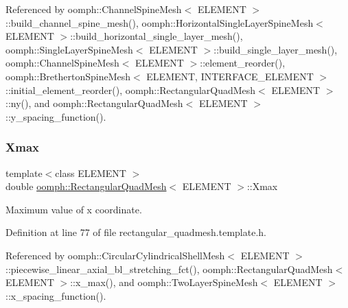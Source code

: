 Referenced by oomph\+::\+Channel\+Spine\+Mesh$<$ E\+L\+E\+M\+E\+N\+T $>$\+::build\+\_\+channel\+\_\+spine\+\_\+mesh(), oomph\+::\+Horizontal\+Single\+Layer\+Spine\+Mesh$<$ E\+L\+E\+M\+E\+N\+T $>$\+::build\+\_\+horizontal\+\_\+single\+\_\+layer\+\_\+mesh(), oomph\+::\+Single\+Layer\+Spine\+Mesh$<$ E\+L\+E\+M\+E\+N\+T $>$\+::build\+\_\+single\+\_\+layer\+\_\+mesh(), oomph\+::\+Channel\+Spine\+Mesh$<$ E\+L\+E\+M\+E\+N\+T $>$\+::element\+\_\+reorder(), oomph\+::\+Bretherton\+Spine\+Mesh$<$ E\+L\+E\+M\+E\+N\+T, I\+N\+T\+E\+R\+F\+A\+C\+E\+\_\+\+E\+L\+E\+M\+E\+N\+T $>$\+::initial\+\_\+element\+\_\+reorder(), oomph\+::\+Rectangular\+Quad\+Mesh$<$ E\+L\+E\+M\+E\+N\+T $>$\+::ny(), and oomph\+::\+Rectangular\+Quad\+Mesh$<$ E\+L\+E\+M\+E\+N\+T $>$\+::y\+\_\+spacing\+\_\+function().

\mbox{\label{classoomph_1_1RectangularQuadMesh_ab8e4ddba0ce8315cf480cdd1f3447684}} 
\subsubsection{\texorpdfstring{Xmax}{Xmax}}
{\footnotesize\ttfamily template$<$class E\+L\+E\+M\+E\+NT $>$ \\
double \hyperlink{classoomph_1_1RectangularQuadMesh}{oomph\+::\+Rectangular\+Quad\+Mesh}$<$ E\+L\+E\+M\+E\+NT $>$\+::Xmax\hspace{0.3cm}{\ttfamily [protected]}}



Maximum value of x coordinate. 



Definition at line 77 of file rectangular\+\_\+quadmesh.\+template.\+h.



Referenced by oomph\+::\+Circular\+Cylindrical\+Shell\+Mesh$<$ E\+L\+E\+M\+E\+N\+T $>$\+::piecewise\+\_\+linear\+\_\+axial\+\_\+bl\+\_\+stretching\+\_\+fct(), oomph\+::\+Rectangular\+Quad\+Mesh$<$ E\+L\+E\+M\+E\+N\+T $>$\+::x\+\_\+max(), and oomph\+::\+Two\+Layer\+Spine\+Mesh$<$ E\+L\+E\+M\+E\+N\+T $>$\+::x\+\_\+spacing\+\_\+function().

\mbox{\label{classoomph_1_1RectangularQuadMesh_af3aab508d077460545031e758396514a}} 
